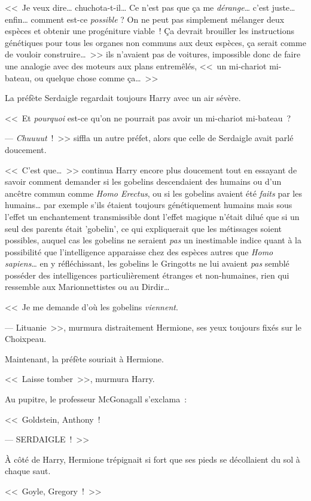 <<~Je veux dire… chuchota-t-il… Ce n'est pas que ça me \emph{dérange…} c'est juste… enfin… comment est-ce \emph{possible} ? On ne peut pas simplement mélanger deux espèces et obtenir une progéniture viable~! Ça devrait brouiller les instructions génétiques pour tous les organes non communs aux deux espèces, ça serait comme de vouloir construire…~>> ils n'avaient pas de voitures, impossible donc de faire une analogie avec des moteurs aux plans entremêlés, <<~un mi-chariot mi-bateau, ou quelque chose comme ça…~>>

La préfète Serdaigle regardait toujours Harry avec un air sévère.

<<~Et \emph{pourquoi} est-ce qu'on ne pourrait pas avoir un mi-chariot mi-bateau~?

--- \emph{Chuuuut}~!~>> siffla un autre préfet, alors que celle de Serdaigle avait parlé doucement.

<<~C'est que…~>> continua Harry encore plus doucement tout en essayant de savoir comment demander si les gobelins descendaient des humains ou d'un ancêtre commun comme \emph{Homo Erectus}, ou si les gobelins avaient été \emph{faits} par les humains… par exemple s'ils étaient toujours génétiquement humains mais sous l'effet un enchantement transmissible dont l'effet magique n'était dilué que si un seul des parents était 'gobelin', ce qui expliquerait que les métissages soient possibles, auquel cas les gobelins ne seraient \emph{pas} un inestimable indice quant à la possibilité que l'intelligence apparaisse chez des espèces autres que \emph{Homo sapiens}… en y réfléchissant, les gobelins le Gringotts ne lui avaient \emph{pas} semblé posséder des intelligences particulièrement étranges et non-humaines, rien qui ressemble aux Marionnettistes ou au Dirdir…

<<~Je me demande d'où les gobelins \emph{viennent}.

--- Lituanie~>>, murmura distraitement Hermione, ses yeux toujours fixés sur le Choixpeau.

Maintenant, la préfète souriait à Hermione.

<<~Laisse tomber~>>, murmura Harry.

Au pupitre, le professeur McGonagall s'exclama~:

<<~Goldstein, Anthony~!

--- SERDAIGLE~!~>>

À côté de Harry, Hermione trépignait si fort que ses pieds se décollaient du sol à chaque saut.

<<~Goyle, Gregory~!~>>

